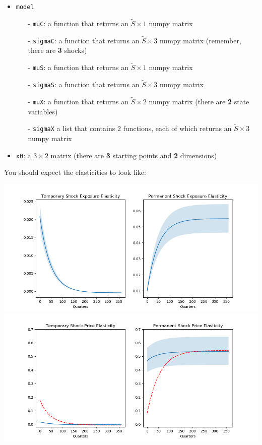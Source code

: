 \documentclass[12pt]{article}
\begin{document}
\begin{itemize}
\item \texttt{model}
	\begin{itemize}
	\item[-] \texttt{muC}: a function that returns an $\tilde{S} \times 1$ numpy matrix
	\item[-] \texttt{sigmaC}: a function that returns an $\tilde{S} \times 3$ numpy matrix (remember, there are \textbf{3} shocks)
	\item[-] \texttt{muS}: a function that returns an $\tilde{S} \times 1$ numpy matrix
	\item[-] \texttt{sigmaS}: a function that returns an $\tilde{S} \times 3$ numpy matrix
	\item[-] \texttt{muX}: a function that returns an $\tilde{S} \times 2$ numpy matrix (there are \textbf{2} state variables)
	\item[-] \texttt{sigmaX} a list that contains $2$ functions, each of which returns an $\tilde{S} \times 3$ numpy matrix
	\end{itemize}

\item \texttt{x0}: a $3 \times 2$ matrix (there are \textbf{3} starting points and \textbf{2} dimensions)
\end{itemize}

You should expect the elasticities to look like:

\begin{center}
\includegraphics[scale=.4]{BY_shockExpo.png}  \\
\includegraphics[scale=.4]{BY_shockPrice.png} \\
\end{center}
\end{document}
